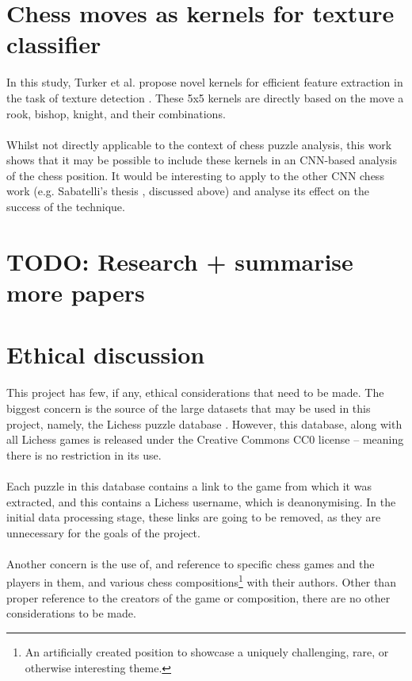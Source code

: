 \section{Chess moves as kernels for texture classifier}
In this study, Turker et al. propose novel kernels for efficient feature extraction
in the task of texture detection \cite{chessKernel}. These 5x5 kernels are
directly based on the move a rook, bishop, knight, and their combinations. 
\\~\\
Whilst not directly applicable to the context of chess puzzle analysis, this work
shows that it may be possible to include these kernels in an CNN-based analysis
of the chess position. It would be interesting to apply to the other CNN chess work
(e.g. Sabatelli's thesis \cite{chessCNN}, discussed above) and analyse its
effect on the success of the technique.

\section{TODO: Research + summarise more papers}

\section{Ethical discussion}
This project has few, if any, ethical considerations that need to be made. The
biggest concern is the source of the large datasets that may be used in this 
project, namely, the Lichess puzzle database \cite{lichessPuzzles}. However,
this database, along with all Lichess games is released under the 
Creative Commons CC0 license -- meaning there is no restriction in its use.
\\~\\
Each puzzle in this database contains a link to the game from which it was
extracted, and this contains a Lichess username, which is deanonymising. In
the initial data processing stage, these links are going to be removed, as
they are unnecessary for the goals of the project.
\\~\\
Another concern is the use of, and reference to specific chess games and the
players in them, and various chess compositions\footnote{An artificially 
created position to showcase a uniquely challenging, rare, or otherwise interesting
theme.} with their authors. Other than proper reference to the creators of the game or
composition, there are no other considerations to be made.